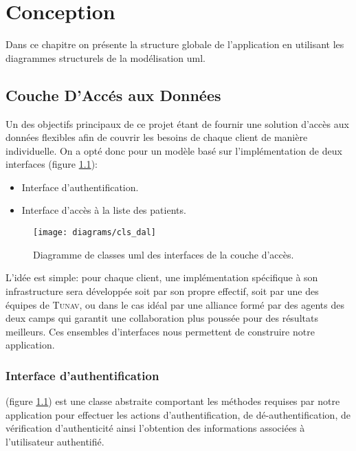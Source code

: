 
\chapter{Conception}


Dans ce chapitre on présente la structure globale de l'application en utilisant les diagrammes structurels de la modélisation \gls{uml}. %

\section[Couche d'Accès aux Données]{Couche D'Accés aux Données}

Un des objectifs principaux de ce projet étant de fournir une solution
d’accès aux données flexibles afin de couvrir les besoins de chaque
client de manière individuelle. On a opté donc pour un modèle basé sur
l’implémentation de deux interfaces (figure \ref{fig:cls_dal}):

\begin{itemize}

\item Interface d'authentification.

\item Interface d’accès à la liste des patients.

\end{itemize}

\begin{figure}
\center
\texttt{[image: diagrams/cls\_dal]}
\caption{Diagramme de classes \gls{uml} des interfaces de la couche d’accès.}
\label{fig:cls_dal}
\end{figure}

L'idée est simple: pour chaque client, une implémentation spécifique à son infrastructure sera développée soit par son propre effectif, soit par une des équipes de \textsc{Tunav}, ou dans le cas idéal par une alliance formé par des agents des deux camps qui garantit une collaboration plus poussée pour des résultats meilleurs.
Ces ensembles d'interfaces nous permettent de construire notre application.

\subsection{Interface d'authentification}

 (figure
\ref{fig:cls_dal}) est une classe abstraite comportant les méthodes
requises par notre application pour effectuer les actions
d'authentification, de dé-authentification, de vérification
d'authenticité ainsi l'obtention des informations associées à l'utilisateur
authentifié.

